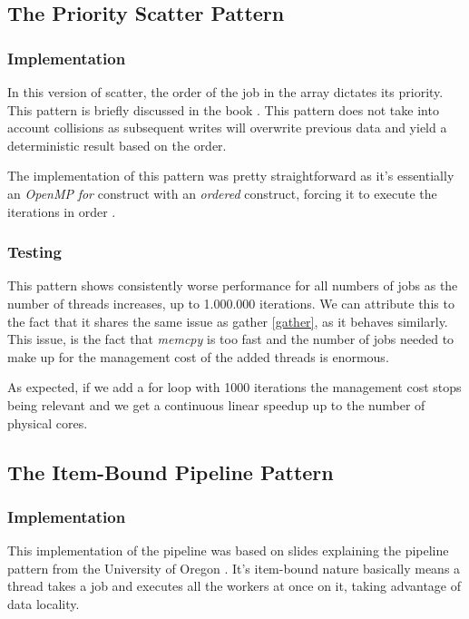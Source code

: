 \documentclass[9pt,journal]{IEEEtran}
\begin{document}
\subsection{The Priority Scatter Pattern}
\subsubsection{Implementation}

In this version of scatter, the order of the job in the array dictates its priority. This pattern is briefly discussed in the book \cite{mccool}. This pattern does not take into account collisions as subsequent writes will overwrite previous data and yield a deterministic result based on the order.

The implementation of this pattern was pretty straightforward as it's essentially an \textit{OpenMP} \textit{for} construct with an \textit{ordered} construct, forcing it to execute the iterations in order \cite{omporder}.

\subsubsection{Testing}

This pattern shows consistently worse performance for all numbers of jobs as the number of threads increases, up to 1.000.000 iterations. We can attribute this to the fact that it shares the same issue as gather \ref{gather}, as it behaves similarly. This issue, is the fact that \textit{memcpy} is too fast and the number of jobs needed to make up for the management cost of the added threads is enormous.

As expected, if we add a for loop with 1000 iterations the management cost stops being relevant and we get a continuous linear speedup up to the number of physical cores. 

\subsection{The Item-Bound Pipeline Pattern}
\label{itembound}

\subsubsection{Implementation}

This implementation of the pipeline was based on slides explaining the pipeline pattern from the University of Oregon \cite{pipelineoregon}. It's item-bound nature basically means a thread takes a job and executes all the workers at once on it, taking advantage of data locality.
\end{document}
